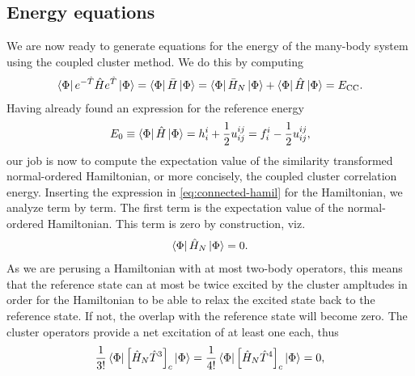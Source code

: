         \subsection{Energy equations}
            \label{subsec:cc-energy-equations}
            We are now ready to generate equations for the energy of the
            many-body system using the coupled cluster method.
            We do this by computing
            \begin{align}
                \bra{\Phi}e^{-\hat{T}}\hat{H} e^{\hat{T}}\ket{\Phi}
                = \bra{\Phi}\bar{H}\ket{\Phi}
                = \bra{\Phi}\bar{H}_N\ket{\Phi}
                + \bra{\Phi}\hat{H}\ket{\Phi}
                = E_{\text{CC}}.
            \end{align}
            Having already found an expression for the reference energy
            \begin{align}
                E_{0} \equiv \bra{\Phi}\hat{H}\ket{\Phi}
                = h^{i}_{i}
                + \frac{1}{2} u^{ij}_{ij}
                = f^{i}_{i}
                - \frac{1}{2}u^{ij}_{ij},
            \end{align}
            our job is now to compute the expectation value of the similarity
            transformed normal-ordered Hamiltonian, or more concisely, the
            coupled cluster correlation energy.
            Inserting the expression in \autoref{eq:connected-hamil} for the
            Hamiltonian, we analyze term by term.
            The first term is the expectation value of the normal-ordered
            Hamiltonian.
            This term is zero by construction, viz.
            \begin{align}
                \bra{\Phi}\hat{H}_N\ket{\Phi} = 0.
            \end{align}
            As we are perusing a Hamiltonian with at most two-body operators,
            this means that the reference state can at most be twice excited by
            the cluster ampltudes in order for the Hamiltonian to be able to
            relax the excited state back to the reference state.
            If not, the overlap with the reference state will become zero.
            The cluster operators provide a net excitation of at least one each,
            thus
            \begin{align}
                \frac{1}{3!}
                \bra{\Phi}\left[ 
                    \hat{H}_N
                    \hat{T}^3
                 \right]_c\ket{\Phi}
                =
                \frac{1}{4!}
                \bra{\Phi}\left[ 
                    \hat{H}_N
                    \hat{T}^4
                 \right]_c\ket{\Phi}
                = 0,
            \end{align}
